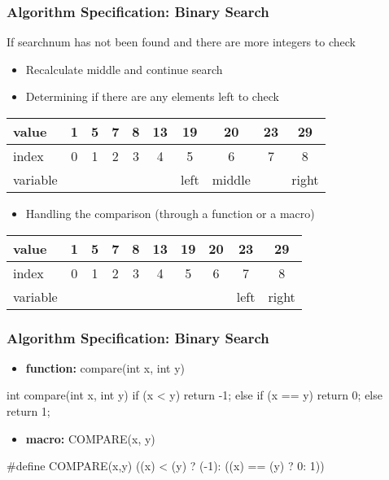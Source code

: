 \documentclass[newPxFont,sthlmFooter,nooffset]{beamer}
\begin{document}
\begin{frame}[t]
	\frametitle{Algorithm Specification: Binary Search}
	If searchnum has not been found
	and there are more integers to check
	\begin{itemize}
		\item Recalculate middle and continue search
		\item Determining if there are any elements left to check
	\end{itemize}
\begin{center}
	\begin{tabular}{| l || c | c | c | c | c | c | c | c | c |}
		\hline
		value & 1 & 5 & 7 & 8 & 13 & \cellcolor{green}19 & \cellcolor{yellow}20 & 23 & \cellcolor{red}29 \\
		\hline
		index & 0 & 1 & 2 & 3 & 4 & \cellcolor{green}5 & \cellcolor{yellow}6 & 7 & \cellcolor{red}8 \\
		\hline
		variable & & & & & & left & middle & & right \\
		\hline
	\end{tabular}
\end{center}
	\begin{itemize}
		\item Handling the comparison (through a function or a macro)
	\end{itemize}
	\begin{center}
		\begin{tabular}{| l || c | c | c | c | c | c | c | c | c |}
			\hline
			value & 1 & 5 & 7 & 8 & 13 & 19 & 20 & \cellcolor{green}23 & \cellcolor{red}29 \\
			\hline
			index & 0 & 1 & 2 & 3 & 4 & 5 & 6 & \cellcolor{green}7 & \cellcolor{red}8 \\
			\hline
			variable & & & & & & & & left & right \\
			\hline
		\end{tabular}
	\end{center}
\end{frame}
\begin{frame}[t, fragile]
  \frametitle{Algorithm Specification: Binary Search}
\begin{itemize}
	\item\textbf {function:} compare(int x, int y)
\end{itemize}

\begin{codedef}
int compare(int x, int y){
	if (x < y) return -1;
	else if (x == y) return 0;
		else return 1;
}
\end{codedef}

\begin{itemize}
	\item\textbf {macro:} COMPARE(x, y)
\end{itemize}

\begin{codedef}
#define COMPARE(x,y) ((x) < (y) ? (-1): ((x) == (y) ? 0: 1))
\end{codedef}

\end{frame}
\end{document}
